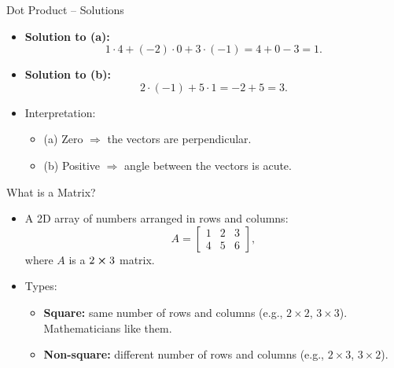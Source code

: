 \documentclass{beamer}
\begin{document}
\begin{frame}{Dot Product – Solutions}
  \begin{itemize}
    \item \textbf{Solution to (a):}
    \[
    1 \cdot 4 + (-2) \cdot 0 + 3 \cdot (-1) = 4 + 0 - 3 = \boxed{1}.
    \]
    \item \textbf{Solution to (b):}
    \[
    2 \cdot (-1) + 5 \cdot 1 = -2 + 5 = \boxed{3}.
    \]
    \item Interpretation:
    \begin{itemize}
      \item (a) Zero \(\Rightarrow\) the vectors are perpendicular.
      \item (b) Positive \(\Rightarrow\) angle between the vectors is acute.
    \end{itemize}
  \end{itemize}
\end{frame}

\begin{frame}{What is a Matrix?}
  \begin{itemize}
    \item A 2D array of numbers arranged in rows and columns:
    \begin{equation}
    A = \begin{bmatrix} 1 & 2 & 3 \\ 4 & 5 & 6 \end{bmatrix},
    \end{equation}
    where \(A\) is a \(2\cross3\) matrix.
    \item Types:
    \begin{itemize}
      \item \textbf{Square:} same number of rows and columns (e.g., $2\times2$, $3\times3$). Mathematicians like them.
      \item \textbf{Non-square:} different number of rows and columns (e.g., $2\times3$, $3\times2$).
    \end{itemize}
  \end{itemize}
\end{frame}
\end{document}
